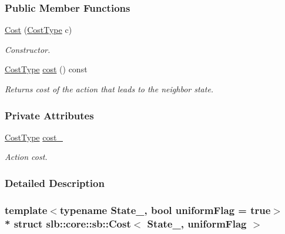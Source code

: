 \subsubsection*{Public Member Functions}
\begin{DoxyCompactItemize}
\item 
\hyperlink{structslb_1_1core_1_1sb_1_1Cost_afee978039270c56faa54b1f9380058ee}{Cost} (\hyperlink{structslb_1_1core_1_1sb_1_1Cost_a383726dcecbf69f396aa3a6d34b60278}{Cost\+Type} c)
\begin{DoxyCompactList}\small\item\em Constructor. \end{DoxyCompactList}\item 
\hyperlink{structslb_1_1core_1_1sb_1_1Cost_a383726dcecbf69f396aa3a6d34b60278}{Cost\+Type} \hyperlink{structslb_1_1core_1_1sb_1_1Cost_a5733d9b60a0bffaa1b69b351618fc6ae}{cost} () const 
\begin{DoxyCompactList}\small\item\em Returns cost of the action that leads to the neighbor state. \end{DoxyCompactList}\end{DoxyCompactItemize}
\subsubsection*{Private Attributes}
\begin{DoxyCompactItemize}
\item 
\hyperlink{structslb_1_1core_1_1sb_1_1Cost_a383726dcecbf69f396aa3a6d34b60278}{Cost\+Type} \hyperlink{structslb_1_1core_1_1sb_1_1Cost_ab337a97a0c3954e33229de4f0e1c6b29}{cost\+\_\+}\hypertarget{structslb_1_1core_1_1sb_1_1Cost_ab337a97a0c3954e33229de4f0e1c6b29}{}\label{structslb_1_1core_1_1sb_1_1Cost_ab337a97a0c3954e33229de4f0e1c6b29}

\begin{DoxyCompactList}\small\item\em Action cost. \end{DoxyCompactList}\end{DoxyCompactItemize}


\subsubsection{Detailed Description}
\subsubsection*{template$<$typename State\+\_\+, bool uniform\+Flag = true$>$\\*
struct slb\+::core\+::sb\+::\+Cost$<$ State\+\_\+, uniform\+Flag $>$}

